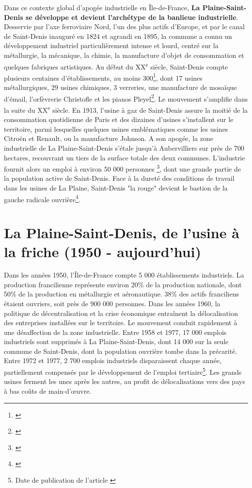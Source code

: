 \documentclass[a4paper,twoside,12pt]{book}
\newcommand{\siecle}[1]{\textsc{#1}\textsuperscript{e} siècle}
\begin{document}
Dans ce contexte global d'apogée industrielle en Île-de-France, \textbf{La Plaine-Saint-Denis se développe et devient l'archétype de la banlieue industrielle}. Desservie par l'axe ferroviaire Nord, l'un des plus actifs d'Europe, et par le canal de Saint-Denis inauguré en 1824 et agrandi en 1895, la commune a connu un développement industriel particulièrement intense et lourd, centré sur la métallurgie, la mécanique,  la chimie, la manufacture d'objet de consommation et quelques fabriques artistiques. Au début du \siecle{XX}, Saint-Denis compte plusieurs centaines d'établissements, au moins 300\footnote{\cite{adda_usine_1979}}, dont 17 usines métallurgiques, 29 usines chimiques, 3 verreries, une manufacture de mosaïque d'émail, l'orfèvrerie Christofle et les pianos Pleyel\footnote{\cite{musee_darcheologie_nationale_saint-denis_nodate}}. Le mouvement s'amplifie dans la suite du \siecle{XX}. En 1913, l'usine à gaz de Saint-Denis assure la moitié de la consommation quotidienne de Paris et des dizaines d'usines s'installent sur le territoire, parmi lesquelles quelques usines emblématiques comme les usines Citroën et Renault, ou la manufacture Johnson. A son apogée, la zone industrielle de La Plaine-Saint-Denis s'étale jusqu'à Aubervilliers sur près de 700 hectares, recouvrant un tiers de la surface totale des deux communes. L'industrie fournit alors un emploi à environ 50 000 personnes \footnote{\cite{adda_usine_1979}}, dont une grande partie de la population active de Saint-Denis. Face à la dureté des conditions de travail dans les usines de La Plaine, Saint-Denis "la rouge" devient le bastion de la gauche radicale ouvrière\footnote{\cite{brunet_saint-denis_1980}}. 

\section{La Plaine-Saint-Denis, de l'usine à la friche (1950 - aujourd'hui)}

Dans les années 1950, l'Île-de-France compte 5 000 établissements industriels. La production francilienne représente environ 20\% de la production nationale, dont 50\% de la production en métallurgie et aéronautique. 38\% des actifs franciliens étaient ouvriers, soit près de 900 000 personnes. Dans les années 1960, la politique de décentralisation et la crise économique entraînent la délocalisation des entreprises installées sur le territoire. Le mouvement conduit rapidement à une désaffection de la zone industrielle. Entre 1958 et 1977, 17 000 emplois industriels sont supprimés à La Plaine-Saint-Denis, dont 14 000 sur la seule commune de Saint-Denis, dont la population ouvrière tombe dans la précarité. Entre 1972 et 1977, 2 700 emplois industriels disparaissent chaque année, partiellement compensés par le développement de l'emploi tertiaire\footnote{Date de publication de l'article \cite{adda_usine_1979}}. Les grands usines ferment les unes après les autres, au profit de délocalisations vers des pays à bas coûts de main-d'œuvre. 
\end{document}
